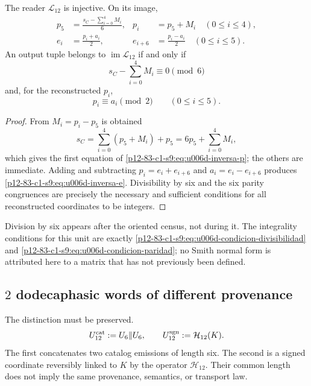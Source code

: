 {\begin{theorem}
\label{p12-83-c1-s9:thm:u006d-inversa-l12}
The reader \(\mathcal L_{12}\) is injective. On its image,
\begin{align}
 p_5&=
 \frac{s_C-\sum_{i=0}^{4}M_i}{6},
 &
 p_i&=p_5+M_i\quad(0\leq i\leq4),
 \label{p12-83-c1-s9:eq:u006d-inversa-p}\\
 e_i&=\frac{p_i+a_i}{2},
 &
 e_{i+6}&=\frac{p_i-a_i}{2}
 \quad(0\leq i\leq5).
 \label{p12-83-c1-s9:eq:u006d-inversa-e}
\end{align}
An output tuple belongs to \(\operatorname{im}\mathcal L_{12}\) if and
only if
\begin{equation}
 s_C-\sum_{i=0}^{4}M_i\equiv0\pmod6
 \label{p12-83-c1-s9:eq:u006d-condicion-divisibilidad}
\end{equation}
and, for the reconstructed \(p_i\),
\begin{equation}
 p_i\equiv a_i\pmod2
 \qquad(0\leq i\leq5).
 \label{p12-83-c1-s9:eq:u006d-condicion-paridad}
\end{equation}
\end{theorem}

\begin{proof}
From \(M_i=p_i-p_5\) is obtained
\[
 s_C=\sum_{i=0}^{4}(p_5+M_i)+p_5
 =6p_5+\sum_{i=0}^{4}M_i,
\]
which gives the first equation of \eqref{p12-83-c1-s9:eq:u006d-inversa-p}; the others are
immediate. Adding and subtracting
\(p_i=e_i+e_{i+6}\) and \(a_i=e_i-e_{i+6}\) produces
\eqref{p12-83-c1-s9:eq:u006d-inversa-e}. Divisibility by six and the six
parity congruences are precisely the necessary and
sufficient conditions for all reconstructed coordinates to be integers.
\end{proof}

Division by six appears after the oriented census, not during it. The
integrality conditions for this unit are exactly
\eqref{p12-83-c1-s9:eq:u006d-condicion-divisibilidad} and
\eqref{p12-83-c1-s9:eq:u006d-condicion-paridad}; no Smith normal form is attributed here to a
matrix that has not previously been defined.

\subsection{\(2\) dodecaphasic words of different provenance}

The distinction must be preserved.
\begin{equation}
 U_{12}^{\rm cat}:=U_6\Vert U_6,
 \qquad
 U_{12}^{\rm sgn}:=\mathcal H_{12}(K).
 \label{p12-83-c1-s9:eq:u006d-dos-palabras-doce}
\end{equation}
The first concatenates two catalog emissions of length six. The second
is a signed coordinate reversibly linked to \(K\) by the operator
\(\mathcal H_{12}\). Their common length does not imply the same provenance,
semantics, or transport law.

}
